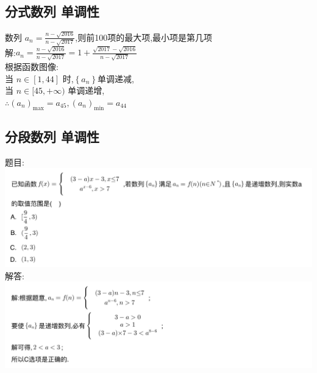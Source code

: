 \documentclass[hyperref, UTF8,11pt,a4paper]{ctexart} %
\begin{document}

\subsection{分式数列 单调性}
{\color{red} 数列 $a_{n}=\frac{n-\sqrt{2016}}{n-\sqrt{2017}}$,则前100项的最大项,最小项是第几项 }\\
解:$a_{n}=\frac{n-\sqrt{2016}}{n-\sqrt{2017}}=1+\frac{\sqrt{2017}-\sqrt{2016}}{n-\sqrt{2017}}$ \\
根据函数图像: \\
当 $n \in[1,44]$ 时,$\left\{a_{n}\right\}$单调递减, \\
当 $n \in[45,+\infty)$ 单调递增, \\
$\therefore \left(a_{n}\right)_{\max }=a_{45},\left(a_{n}\right)_{\min }=a_{44}$


\subsection{分段数列 单调性}
{\color{red}  题目: } \\
\includegraphics[width=500pt]  {pic/shulie/fenduanhanshutimu.jpg} \\
解答: \\
\includegraphics[width=500pt]  {pic/shulie/fenduanhanshudaan.jpg} \\

\end{document}
